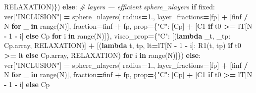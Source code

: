 \documentclass[
  a4paper,
  numbers=noendperiod,
  DIV=12]{scrreprt}
\newenvironment{Shaded}{\begin{snugshade}}{\end{snugshade}}
\newcommand{\BuiltInTok}[1]{#1}
\newcommand{\CommentTok}[1]{\textcolor[rgb]{0.56,0.35,0.01}{\textit{#1}}}
\newcommand{\ControlFlowTok}[1]{\textcolor[rgb]{0.13,0.29,0.53}{\textbf{#1}}}
\newcommand{\DecValTok}[1]{\textcolor[rgb]{0.00,0.00,0.81}{#1}}
\newcommand{\FloatTok}[1]{\textcolor[rgb]{0.00,0.00,0.81}{#1}}
\newcommand{\KeywordTok}[1]{\textcolor[rgb]{0.13,0.29,0.53}{\textbf{#1}}}
\newcommand{\NormalTok}[1]{#1}
\newcommand{\OperatorTok}[1]{\textcolor[rgb]{0.81,0.36,0.00}{\textbf{#1}}}
\newcommand{\StringTok}[1]{\textcolor[rgb]{0.31,0.60,0.02}{#1}}
\begin{document}
\begin{Shaded}
\begin{Highlighting}[]
\NormalTok{                        RELAXATION)\})}
    \ControlFlowTok{else}\NormalTok{:  }\CommentTok{\# \textquotesingle{}layers\textquotesingle{} — efficient sphere\_nlayers}
        \ControlFlowTok{if}\NormalTok{ fixed:}
\NormalTok{            ver[}\StringTok{"INCLUSION"}\NormalTok{] }\OperatorTok{=}\NormalTok{ sphere\_nlayers(}
\NormalTok{                radius}\OperatorTok{=}\FloatTok{1.}\NormalTok{,}
\NormalTok{                layer\_fractions}\OperatorTok{=}\NormalTok{[fp] }\OperatorTok{+}\NormalTok{ [finf }\OperatorTok{/}\NormalTok{ N }\ControlFlowTok{for}\NormalTok{ \_ }\KeywordTok{in} \BuiltInTok{range}\NormalTok{(N)],}
\NormalTok{                fraction}\OperatorTok{=}\NormalTok{finf }\OperatorTok{+}\NormalTok{ fp,}
\NormalTok{                prop}\OperatorTok{=}\NormalTok{\{}\StringTok{"C"}\NormalTok{: [Cp] }\OperatorTok{+}\NormalTok{ [C1 }\ControlFlowTok{if}\NormalTok{ t0 }\OperatorTok{\textgreater{}=}\NormalTok{ lT[N }\OperatorTok{{-}} \DecValTok{1} \OperatorTok{{-}}\NormalTok{ i] }\ControlFlowTok{else}\NormalTok{ Cp}
                                   \ControlFlowTok{for}\NormalTok{ i }\KeywordTok{in} \BuiltInTok{range}\NormalTok{(N)]\},}
\NormalTok{                visco\_prop}\OperatorTok{=}\NormalTok{\{}\StringTok{"C"}\NormalTok{:}
\NormalTok{                    [(}\KeywordTok{lambda}\NormalTok{ \_t, \_tp: Cp.array, RELAXATION)] }\OperatorTok{+}
\NormalTok{                    [(}\KeywordTok{lambda}\NormalTok{ t, tp, lt}\OperatorTok{=}\NormalTok{lT[N }\OperatorTok{{-}} \DecValTok{1} \OperatorTok{{-}}\NormalTok{ i]: R1(t, tp) }\ControlFlowTok{if}\NormalTok{ t0 }\OperatorTok{\textgreater{}=}\NormalTok{ lt }\ControlFlowTok{else}\NormalTok{ Cp.array,}
\NormalTok{                      RELAXATION)}
                     \ControlFlowTok{for}\NormalTok{ i }\KeywordTok{in} \BuiltInTok{range}\NormalTok{(N)]\})}
        \ControlFlowTok{else}\NormalTok{:}
\NormalTok{            ver[}\StringTok{"INCLUSION"}\NormalTok{] }\OperatorTok{=}\NormalTok{ sphere\_nlayers(}
\NormalTok{                radius}\OperatorTok{=}\FloatTok{1.}\NormalTok{,}
\NormalTok{                layer\_fractions}\OperatorTok{=}\NormalTok{[fp] }\OperatorTok{+}\NormalTok{ [finf }\OperatorTok{/}\NormalTok{ N }\ControlFlowTok{for}\NormalTok{ \_ }\KeywordTok{in} \BuiltInTok{range}\NormalTok{(N)],}
\NormalTok{                fraction}\OperatorTok{=}\NormalTok{finf }\OperatorTok{+}\NormalTok{ fp,}
\NormalTok{                prop}\OperatorTok{=}\NormalTok{\{}\StringTok{"C"}\NormalTok{: [Cp] }\OperatorTok{+}\NormalTok{ [C1 }\ControlFlowTok{if}\NormalTok{ t0 }\OperatorTok{\textgreater{}=}\NormalTok{ lT[N }\OperatorTok{{-}} \DecValTok{1} \OperatorTok{{-}}\NormalTok{ i] }\ControlFlowTok{else}\NormalTok{ Cp}

\end{Highlighting}
\end{Shaded}
\end{document}
